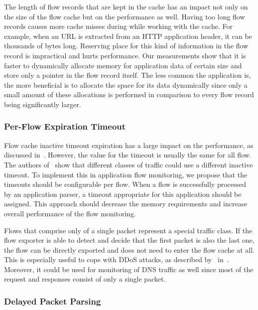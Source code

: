 The length of flow records that are kept in the cache has an impact not only on the size of the flow cache but on the performance as well. Having too long flow records causes more cache misses during while working with the cache. For example, when an URL is extracted from an HTTP application header, it can be thousands of bytes long. Reserving place for this kind of information in the flow record is impractical and hurts performance. Our measurements show that it is faster to dynamically allocate memory for application data of certain size and store only a pointer in the flow record itself. The less common the application is, the more beneficial is to allocate the space for its data dynamically since only a small amount of these allocations is performed in comparison to every flow record being significantly larger.

\subsubsection{Per-Flow Expiration Timeout}

Flow cache inactive timeout expiration has a large impact on the performance, as discussed in~\cite{Rodriguez-2013-Empirical, Molina-2006-Design}. However, the value for the timeout is usually the same for all flow. The authors of~\cite{Rodriguez-2013-Empirical} show that different classes of traffic could use a different inactive timeout. To implement this in application flow monitoring, we propose that the timeouts should be configurable per flow. When a flow is successfully processed by an application parser, a timeout appropriate for this application should be assigned. This approach should decrease the memory requirements and increase overall performance of the flow monitoring.

Flows that comprise only of a single packet represent a special traffic class. If the flow exporter is able to detect and decide that the first packet is also the last one, the flow can be directly exported and does not need to enter the flow cache at all. This is especially useful to cope with DDoS attacks, as described by~\citeauthor{Sadre-2012-Effects} in~\cite{Sadre-2012-Effects}. Moreover, it could be used for monitoring of DNS traffic as well since most of the request and responses consist of only a single packet.

\subsubsection{Delayed Packet Parsing}

